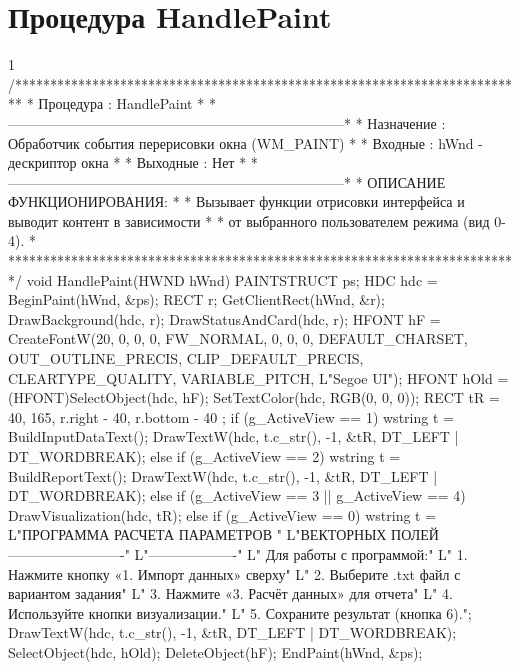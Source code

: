 \section{Процедура HandlePaint}
\footnotesize
\begin{listing}{1}
/*************************************************************************
* Процедура     : HandlePaint                                            *
*------------------------------------------------------------------------*
* Назначение    : Обработчик события перерисовки окна (WM_PAINT)         *
* Входные       : hWnd - дескриптор окна                                 *
* Выходные      : Нет                                                    *
*------------------------------------------------------------------------*
* ОПИСАНИЕ ФУНКЦИОНИРОВАНИЯ:                                             *
* Вызывает функции отрисовки интерфейса и выводит контент в зависимости    *
* от выбранного пользователем режима (вид 0-4).                          *
*************************************************************************/
void HandlePaint(HWND hWnd) {
    PAINTSTRUCT ps; HDC hdc = BeginPaint(hWnd, &ps); RECT r; GetClientRect(hWnd, &r);
    DrawBackground(hdc, r); DrawStatusAndCard(hdc, r);
    HFONT hF = CreateFontW(20, 0, 0, 0, FW_NORMAL, 0, 0, 0, DEFAULT_CHARSET,
        OUT_OUTLINE_PRECIS,  CLIP_DEFAULT_PRECIS, CLEARTYPE_QUALITY, 
        VARIABLE_PITCH, L"Segoe UI");
    HFONT hOld = (HFONT)SelectObject(hdc, hF); SetTextColor(hdc, RGB(0, 0, 0)); 
    RECT tR = { 40, 165, r.right - 40, r.bottom - 40 };
    if (g_ActiveView == 1) { wstring t = BuildInputDataText(); 
        DrawTextW(hdc, t.c_str(), -1, &tR, DT_LEFT | DT_WORDBREAK);}
    else if (g_ActiveView == 2) { wstring t = BuildReportText(); 
        DrawTextW(hdc, t.c_str(), -1, &tR, DT_LEFT | DT_WORDBREAK);}
    else if (g_ActiveView == 3 || g_ActiveView == 4) DrawVisualization(hdc, tR);
    else if (g_ActiveView == 0) { wstring t = L"\n\n ПРОГРАММА РАСЧЕТА ПАРАМЕТРОВ "
                    L"ВЕКТОРНЫХ ПОЛЕЙ\n       -------------------------"
                    L"-------------------\n\n"
                    L"       Для работы с программой:\n\n"
                    L"       1. Нажмите кнопку «1. Импорт данных» сверху\n"
                    L"       2. Выберите .txt файл с вариантом задания\n"
                    L"       3. Нажмите «3. Расчёт данных» для отчета\n"
                    L"       4. Используйте кнопки визуализации.\n"
                    L"       5. Сохраните результат (кнопка 6).\n";
        DrawTextW(hdc, t.c_str(), -1, &tR, DT_LEFT | DT_WORDBREAK);}
    SelectObject(hdc, hOld); DeleteObject(hF); EndPaint(hWnd, &ps);
}
\end{listing}
\normalsize
\pagebreak